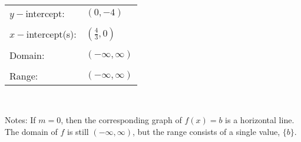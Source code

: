 \documentclass[12pt]{book}
\theoremstyle{definition}
\begin{document}
\ \par
\begin{tabular}{ll}
$y-$intercept: & $(0,-4)$\\
&\\
$x-$intercept(s): & $\left(\frac{4}{3},0\right)$\\
&\\
Domain: & $(-\infty,\infty)$\\
&\\
Range: & $(-\infty,\infty)$
\end{tabular}
\\
\vspace{0.25in}

Notes: If $m=0$, then the corresponding graph of $f(x)=b$ is a horizontal line.  The domain of $f$ is still $(-\infty,\infty)$, but the range consists of a single value, $\{b\}$. 
\newpage
\end{document}
